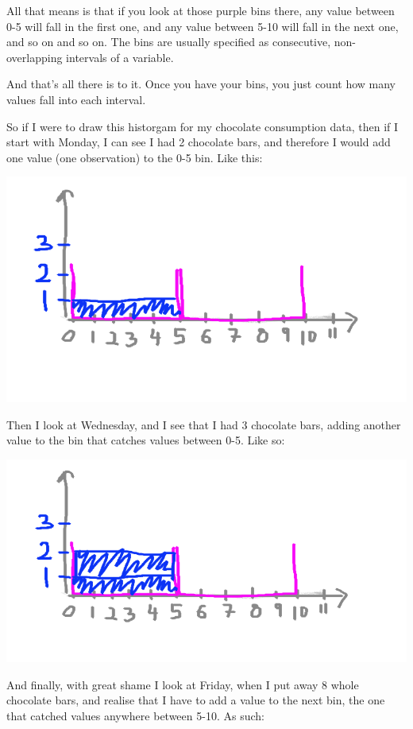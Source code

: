 \documentclass[
]{book}
\begin{document}
All that means is that if you look at those purple bins there, any value between 0-5 will fall in the first one, and any value between 5-10 will fall in the next one, and so on and so on. The bins are usually specified as consecutive, non-overlapping intervals of a variable.

And that's all there is to it. Once you have your bins, you just count how many values fall into each interval.

So if I were to draw this historgam for my chocolate consumption data, then if I start with Monday, I can see I had 2 chocolate bars, and therefore I would add one value (one observation) to the 0-5 bin. Like this:

\includegraphics{imgs/hist_fill_1.png}

Then I look at Wednesday, and I see that I had 3 chocolate bars, adding another value to the bin that catches values between 0-5. Like so:

\includegraphics{imgs/hist_fill_2.png}

And finally, with great shame I look at Friday, when I put away 8 whole chocolate bars, and realise that I have to add a value to the next bin, the one that catched values anywhere between 5-10. As such:
\end{document}
